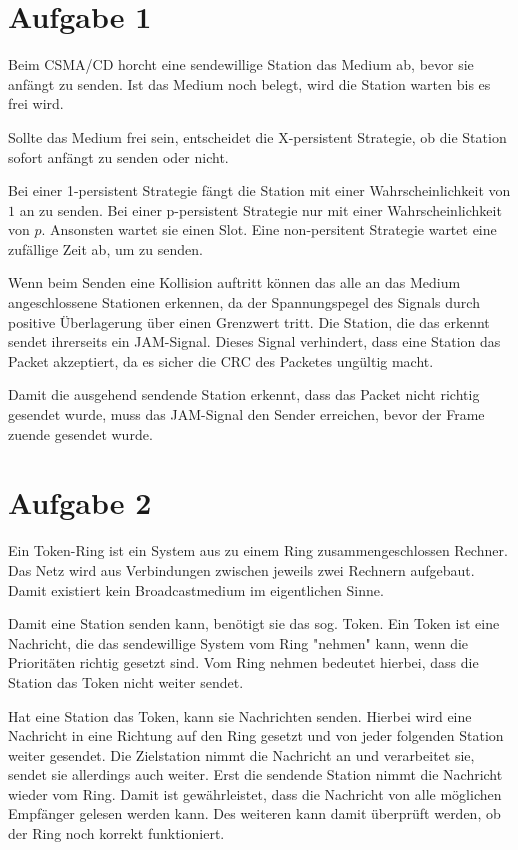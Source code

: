 \section{Aufgabe 1}

Beim CSMA/CD horcht eine sendewillige Station das Medium ab, bevor sie anfängt
zu senden. Ist das Medium noch belegt, wird die Station warten bis es frei wird.

Sollte das Medium frei sein, entscheidet die X-persistent Strategie, ob die
Station sofort anfängt zu senden oder nicht.

Bei einer 1-persistent Strategie fängt die Station mit einer Wahrscheinlichkeit
von $1$ an zu senden. Bei einer p-persistent Strategie nur mit einer
Wahrscheinlichkeit von $p$. Ansonsten wartet sie einen Slot. Eine non-persitent
Strategie wartet eine zufällige Zeit ab, um zu senden.

Wenn beim Senden eine Kollision auftritt können das alle an das Medium
angeschlossene Stationen erkennen, da der Spannungspegel des Signals durch
positive Überlagerung über einen Grenzwert tritt. Die Station, die das erkennt
sendet ihrerseits ein JAM-Signal. Dieses Signal verhindert, dass eine Station
das Packet akzeptiert, da es sicher die CRC des Packetes ungültig macht.

Damit die ausgehend sendende Station erkennt, dass das Packet nicht richtig
gesendet wurde, muss das JAM-Signal den Sender erreichen, bevor der Frame zuende
gesendet wurde.


\section{Aufgabe 2}

Ein Token-Ring ist ein System aus zu einem Ring zusammengeschlossen Rechner. Das
Netz wird aus Verbindungen zwischen jeweils zwei Rechnern aufgebaut. Damit
existiert kein Broadcastmedium im eigentlichen Sinne.

Damit eine Station senden kann, benötigt sie das sog. Token. Ein Token ist eine
Nachricht, die das sendewillige System vom Ring "nehmen" kann, wenn die
Prioritäten richtig gesetzt sind. Vom Ring nehmen bedeutet hierbei, dass die
Station das Token nicht weiter sendet. 

Hat eine Station das Token, kann sie Nachrichten senden. Hierbei wird eine
Nachricht in eine Richtung auf den Ring gesetzt und von jeder folgenden Station
weiter gesendet. Die Zielstation nimmt die Nachricht an und verarbeitet sie,
sendet sie allerdings auch weiter. Erst die sendende Station nimmt die Nachricht
wieder vom Ring. Damit ist gewährleistet, dass die Nachricht von alle möglichen
Empfänger gelesen werden kann. Des weiteren kann damit überprüft werden, ob der
Ring noch korrekt funktioniert.

